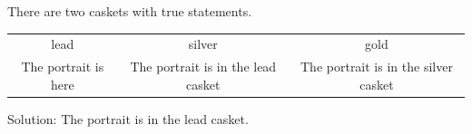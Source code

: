 There are two caskets with true statements.
\begin{tabular}{ccc}
\toprule
lead & silver & gold\\
The portrait is here & The portrait is in the lead casket & The portrait is in the silver casket\\
\bottomrule
\end{tabular}
Solution: The portrait is in the lead casket.
